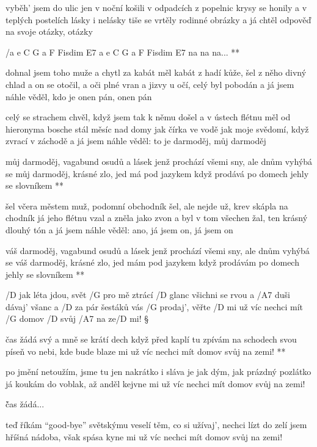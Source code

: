vyběh' jsem do ulic jen v noční košili
v odpadcích z popelnic krysy se honily
a v teplých postelích lásky i nelásky
tiše se vrtěly rodinné obrázky
a já chtěl odpověď na svoje otázky, otázky

\R  /{a e C G a F Fisdim E7 a e C G a F Fisdim E7} na na na... **

dohnal jsem toho muže a chytl za kabát
měl kabát z hadí kůže, šel z něho divný chlad
a on se otočil, a oči plné vran
a jizvy u očí, celý byl pobodán
a já jsem náhle věděl, kdo je onen pán, onen pán \s

celý se strachem chvěl, když jsem tak k němu došel
a v ústech flétnu měl od hieronyma bosche
stál měsíc nad domy jak čírka ve vodě
jak moje svědomí, když zvrací v záchodě
a já jsem náhle věděl: to je darmoděj, můj darmoděj

\R  můj darmoděj, vagabund osudů a lásek
    jenž prochází všemi sny, ale dnům vyhýbá se
    můj darmoděj, krásné zlo, jed má pod jazykem
    když prodává po domech jehly se slovníkem **

šel včera městem muž, podomní obchodník
šel, ale nejde už, krev skápla na chodník
já jeho flétnu vzal a zněla jako zvon
a byl v tom všechen žal, ten krásný dlouhý tón
a já jsem náhle věděl: ano, já jsem on, já jsem on

\R  váš darmoděj, vagabund osudů a lásek
    jenž prochází všemi sny, ale dnům vyhýbá se
    váš darmoděj, krásné zlo, jed mám pod jazykem
    když prodávám po domech jehly se slovníkem **




/D jak léta jdou, svět /G pro mě ztrácí /D glanc
všichni se rvou a /A7 duši dávaj' všanc
a /D za pár šestáků vás /G prodaj', věřte /D mi
už víc nechci mít /G domov /D svůj /A7 na ze/D mi! \S

\R  čas žádá svý a mně se krátí dech
    když před kaplí tu zpívám na schodech
    svou píseň vo nebi, kde bude blaze mi
    už víc nechci mít domov svůj na zemi! **

po jmění netoužím, jsme tu jen nakrátko
i sláva je jak dým, jak prázdný pozlátko
já koukám do voblak, až anděl kejvne mi
už víc nechci mít domov svůj na zemi!

\r čas žádá...

teď říkám ``good-bye'' světskýmu veselí
těm, co si užívaj', nechci lízt do zelí
jsem hříšná nádoba, však spása kyne mi
už víc nechci mít domov svůj na zemi!

\rr


